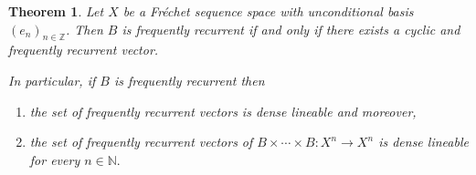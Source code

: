 \documentclass[11pt]{amsart}
\newtheorem{theorem}{Theorem}[section]
\newcommand{\zN}{\mathbb N}
\begin{document}






\begin{theorem}\label{cyclic and frequently recurrent vector bil}
Let $X$ be a Fr\'echet sequence space with unconditional basis $(e_n)_{n\in\mathbb Z}$. Then  $B$ is frequently recurrent if and only if there exists a cyclic and frequently recurrent vector.

In particular, if $B$ is frequently recurrent then
\begin{enumerate}
    \item the set of frequently recurrent vectors is dense lineable and moreover,
    \item the set of frequently recurrent vectors of $B\times\cdots \times B:X^n\to X^n$ is dense lineable for every $n\in\mathbb N.$
\end{enumerate}
\end{theorem}
\end{document}
